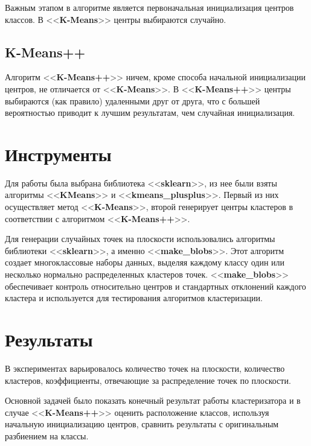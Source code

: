 \documentclass[12pt, a4paper]{article}
\begin{document}
    Важным этапом в алгоритме является первоначальная инициализация центров 
    классов. В <<\textbf{K-Means}>> центры выбираются случайно.
    
    \subsection{K-Means++}
    
    Алгоритм <<\textbf{K-Means++}>> ничем, кроме способа начальной 
    инициализации центров, не отличается от <<\textbf{K-Means}>>. В 
    <<\textbf{K-Means++}>> центры выбираются (как правило) удаленными друг от 
    друга, что с большей вероятностью приводит к лучшим результатам, чем 
    случайная инициализация.
    
    \section{Инструменты}
    
    Для работы была выбрана библиотека <<\textbf{sklearn}>>, из нее были 
    взяты алгоритмы <<\textbf{KMeans}>> и <<\textbf{kmeans\_plusplus}>>. 
    Первый из них осуществляет метод <<\textbf{K-Means}>>, второй генерирует 
    центры кластеров в соответствии с алгоритмом <<\textbf{K-Means++}>>.
    
    Для генерации случайных точек на плоскости использовались алгоритмы 
    библиотеки <<\textbf{sklearn}>>, а именно <<\textbf{make\_blobs}>>. Этот 
    алгоритм создает многоклассовые наборы данных, выделяя каждому классу 
    один или несколько нормально распределенных кластеров точек. 
    <<\textbf{make\_blobs}>> обеспечивает контроль относительно центров и 
    стандартных отклонений каждого кластера и используется для тестирования 
    алгоритмов кластеризации.
    
    \section{Результаты}
    
    В экспериментах варьировалось количество точек на плоскости, количество 
    кластеров, коэффициенты, отвечающие за распределение точек по плоскости. 
    
    Основной задачей было показать конечный результат работы кластеризатора и 
    в случае <<\textbf{K-Means++}>> оценить расположение классов, используя 
    начальную инициализацию центров, сравнить результаты с оригинальным 
    разбиением на классы.
    
\end{document}
